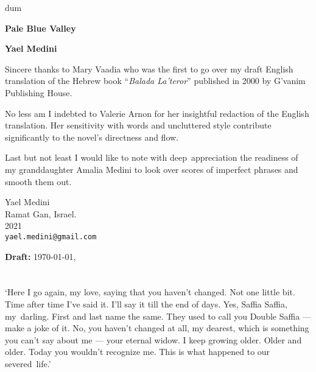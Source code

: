\documentclass[twoside,11pt]{book}
\begin{document}
\thispagestyle{empty}
{\nullfont dum}
\vspace{.3\textheight}
\begin{center}
{\Huge \textbf{Pale Blue Valley}}

\bigskip

\textbf{\Large Yael Medini}
\end{center}
\vspace{.1\textheight}

Sincere thanks to Mary Vaadia who was the first to go over my draft
English translation of the Hebrew book ``\emph{Balada La'teror}''
published in 2000 by G'vanim Publishing House.

\bigskip
No less am I indebted to Valerie Arnon for her insightful redaction of
the English translation. Her sensitivity with words and uncluttered
style contribute significantly to the novel's directness and flow.

\bigskip
Last but not least I would like to note with deep~appreciation the
readiness of my granddaughter Amalia Medini to look over scores of
imperfect phrases and smooth them out.


\bigskip
{
\parindent=0pt
Yael Medini\\
Ramat Gan, Israel. \\
2021 \\
\texttt{yael.medini@gmail.com}
}

\ifdefined\ymdhms
 \bigskip
 \textbf{Draft:}  \today, \currenttime
\fi

\chapter{}

`Here I go again,
my love,{ saying that you haven't changed. Not one little
bit}. {Time after time I've said it. I'll say it
till the end of days. Yes, Saffia Saffia, my~darling. First and last name the same. }They used to call you Double
Saffia --- make a joke of it.{ No,
you} {haven't
changed }at all, my dearest, which is something you can't say about
me --- your
eternal{ widow. I keep growing older. Older and older.
}Today{ you wouldn't recognize me. This is what happened to our
severed~life.'}
\end{document}
